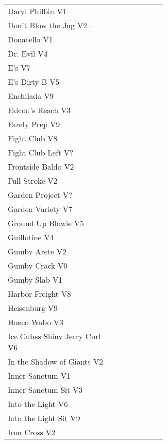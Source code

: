 \begin{center}
\begin{supertabular}{p{0.65\linewidth}r}
Daryl Philbin V1 & \pageref{rt:Daryl Philbin} \\
Don't Blow the Jug V2+ & \pageref{rt:Don't Blow the Jug} \\
Donatello V1 & \pageref{rt:Donatello} \\
Dr. Evil V4 & \pageref{rt:Dr. Evil} \\
E's V7 & \pageref{rt:E's} \\
E's Dirty B V5 & \pageref{rt:E's Dirty B} \\
Enchilada V9 & \pageref{rt:Enchilada} \\
Falcon's Reach V3 & \pageref{rt:Falcon's Reach} \\
Farely Prep V9 & \pageref{rt:Farely Prep} \\
Fight Club V8 & \pageref{rt:Fight Club} \\
Fight Club Left V? & \pageref{rt:Fight Club Left} \\
Frontside Baldo V2 & \pageref{rt:Frontside Baldo} \\
Full Stroke V2 & \pageref{rt:Full Stroke} \\
Garden Project V? & \pageref{rt:Garden Project} \\
Garden Variety V7 & \pageref{rt:Garden Variety} \\
Ground Up Blowie V5 & \pageref{rt:Ground Up Blowie} \\
Guillotine V4 & \pageref{rt:Guillotine} \\
Gumby Arete V2 & \pageref{rt:Gumby Arete} \\
Gumby Crack V0 & \pageref{rt:Gumby Crack} \\
Gumby Slab V1 & \pageref{rt:Gumby Slab} \\
Harbor Freight V8 & \pageref{vr:Harbor Freight} \\
Heisenburg V9 & \pageref{rt:Heisenburg} \\
Hueco Wabo V3 & \pageref{rt:Hueco Wabo} \\
Ice Cubes Shiny Jerry Curl V6 & \pageref{rt:Ice Cubes Shiny Jerry Curl} \\
In the Shadow of Giants V2 & \pageref{rt:In the Shadow of Giants} \\
Inner Sanctum V1 & \pageref{rt:Inner Sanctum} \\
Inner Sanctum Sit V3 & \pageref{vr:Inner Sanctum Sit} \\
Into the Light V6 & \pageref{rt:Into the Light} \\
Into the Light Sit V9 & \pageref{vr:Into the Light Sit} \\
Iron Cross V2 & \pageref{vr:Iron Cross} \\

\end{supertabular}
\end{center}
